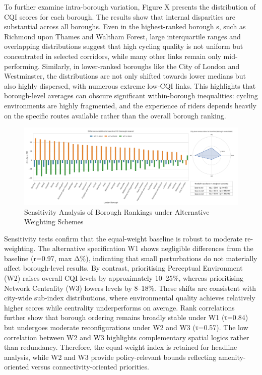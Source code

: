 \documentclass[
  12pt,
  oneside]{book}
\begin{document}
To further examine intra-borough variation, Figure X presents the distribution of CQI scores for each borough. The results show that internal disparities are substantial across all boroughs. Even in the highest-ranked borough s, such as Richmond upon Thames and Waltham Forest, large interquartile ranges and overlapping distributions suggest that high cycling quality is not uniform but concentrated in selected corridors, while many other links remain only mid-performing. Similarly, in lower-ranked boroughs like the City of London and Westminster, the distributions are not only shifted towards lower medians but also highly dispersed, with numerous extreme low-CQI links. This highlights that borough-level averages can obscure significant within-borough inequalities: cycling environments are highly fragmented, and the experience of riders depends heavily on the specific routes available rather than the overall borough ranking.

\begin{figure}

{\centering \includegraphics[width=0.95\linewidth]{general_images/cqi_robustness_delta_bar} 

}

\caption{Sensitivity Analysis of Borough Rankings under Alternative Weighting Schemes}\label{fig:cqirobustnessdeltabar}
\end{figure}

Sensitivity tests confirm that the equal-weight baseline is robust to moderate re-weighting. The alternative specification W1 shows negligible differences from the baseline (r=0.97, max \textbar Δ\%), indicating that small perturbations do not materially affect borough-level results. By contrast, prioritising Perceptual Environment (W2) raises overall CQI levels by approximately 10--25\%, whereas prioritising Network Centrality (W3) lowers levels by 8--18\%. These shifts are consistent with city-wide sub-index distributions, where environmental quality achieves relatively higher scores while centrality underperforms on average. Rank correlations further show that borough ordering remains broadly stable under W1 (τ=0.84) but undergoes moderate reconfigurations under W2 and W3 (τ=0.57). The low correlation between W2 and W3 highlights complementary spatial logics rather than redundancy. Therefore, the equal-weight index is retained for headline analysis, while W2 and W3 provide policy-relevant bounds reflecting amenity-oriented versus connectivity-oriented priorities.
\end{document}
